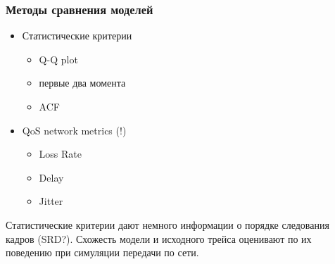 \documentclass[10pt,pdf,hyperref={unicode}]{beamer}
\begin{document}
\begin{frame}
    \frametitle{Методы сравнения моделей}
    \begin{itemize}
        \item Статистические критерии
        \begin{itemize}
            \item Q-Q plot
            \item первые два момента
            \item ACF
        \end{itemize}

        \item QoS network metrics (!)
        \begin{itemize}
            \item Loss Rate
            \item Delay
            \item Jitter
        \end{itemize}
    \end{itemize}

    Статистические критерии дают немного информации о
    порядке следования кадров (SRD?). Схожесть модели
    и исходного трейса оценивают по их поведению при
    симуляции передачи по сети.
\end{frame}
\end{document}
